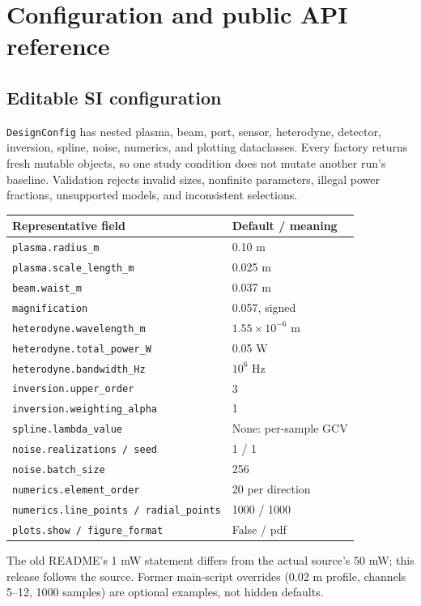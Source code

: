 \documentclass[11pt,letterpaper]{article}
\newcommand{\code}[1]{\nolinkurl{#1}}
\begin{document}
\section{Configuration and public API reference}
\subsection{Editable SI configuration}
\code{DesignConfig} has nested plasma, beam, port, sensor, heterodyne, detector,
inversion, spline, noise, numerics, and plotting dataclasses. Every factory
returns fresh mutable objects, so one study condition does not mutate another
run's baseline. Validation rejects invalid sizes, nonfinite parameters, illegal
power fractions, unsupported models, and inconsistent selections.

\begin{center}\small
\begin{tabular}{p{3.6in}p{2.0in}}\toprule
Representative field & Default / meaning\\\midrule
\code{plasma.radius_m} & 0.10 m\\
\code{plasma.scale_length_m} & 0.025 m\\
\code{beam.waist_m} & 0.037 m\\
\code{magnification} & 0.057, signed\\
\code{heterodyne.wavelength_m} & $1.55\times10^{-6}$ m\\
\code{heterodyne.total_power_W} & 0.05 W\\
\code{heterodyne.bandwidth_Hz} & $10^6$ Hz\\
\code{inversion.upper_order} & 3\\
\code{inversion.weighting_alpha} & 1\\
\code{spline.lambda_value} & None: per-sample GCV\\
\code{noise.realizations / seed} & 1 / 1\\
\code{noise.batch_size} & 256\\
\code{numerics.element_order} & 20 per direction\\
\code{numerics.line_points / radial_points} & 1000 / 1000\\
\code{plots.show / figure_format} & False / pdf\\\bottomrule
\end{tabular}\end{center}
The old README's 1 mW statement differs from the actual source's 50 mW; this
release follows the source. Former main-script overrides (0.02 m profile,
channels 5--12, 1000 samples) are optional examples, not hidden defaults.
\end{document}
